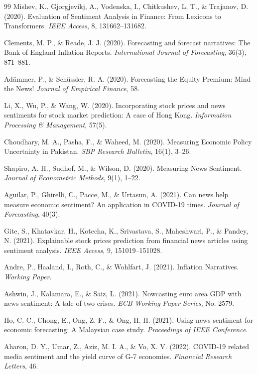 \documentclass[11pt]{article}
\begin{document}
\begin{thebibliography}{99}
 Mishev, K., Gjorgjevikj, A., Vodenska, I., Chitkushev, L. T., \& Trajanov, D. (2020). Evaluation of Sentiment Analysis in Finance: From Lexicons to Transformers. \textit{IEEE Access}, 8, 131662--131682.

 Clements, M. P., \& Reade, J. J. (2020). Forecasting and forecast narratives: The Bank of England Inflation Reports. \textit{International Journal of Forecasting}, 36(3), 871--881.

 Adämmer, P., \& Schüssler, R. A. (2020). Forecasting the Equity Premium: Mind the News! \textit{Journal of Empirical Finance}, 58.

 Li, X., Wu, P., \& Wang, W. (2020). Incorporating stock prices and news sentiments for stock market prediction: A case of Hong Kong. \textit{Information Processing \& Management}, 57(5).

 Choudhary, M. A., Pasha, F., \& Waheed, M. (2020). Measuring Economic Policy Uncertainty in Pakistan. \textit{SBP Research Bulletin}, 16(1), 3--26.

 Shapiro, A. H., Sudhof, M., \& Wilson, D. (2020). Measuring News Sentiment. \textit{Journal of Econometric Methods}, 9(1), 1--22.

 Aguilar, P., Ghirelli, C., Pacce, M., \& Urtasun, A. (2021). Can news help measure economic sentiment? An application in COVID-19 times. \textit{Journal of Forecasting}, 40(3).

 Gite, S., Khatavkar, H., Kotecha, K., Srivastava, S., Maheshwari, P., \& Pandey, N. (2021). Explainable stock prices prediction from financial news articles using sentiment analysis. \textit{IEEE Access}, 9, 151019--151028.

 Andre, P., Haaland, I., Roth, C., \& Wohlfart, J. (2021). Inflation Narratives. \textit{Working Paper}.

 Ashwin, J., Kalamara, E., \& Saiz, L. (2021). Nowcasting euro area GDP with news sentiment: A tale of two crises. \textit{ECB Working Paper Series}, No. 2579.

 Ho, C. C., Chong, E., Ong, Z. F., \& Ong, H. H. (2021). Using news sentiment for economic forecasting: A Malaysian case study. \textit{Proceedings of IEEE Conference}.

 Aharon, D. Y., Umar, Z., Aziz, M. I. A., \& Vo, X. V. (2022). COVID-19 related media sentiment and the yield curve of G-7 economies. \textit{Financial Research Letters}, 46.


\end{thebibliography}
\end{document}
